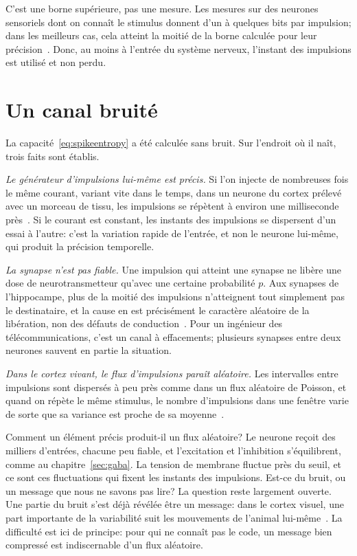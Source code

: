 C'est une borne supérieure, pas une mesure. Les mesures sur des neurones sensoriels dont on connaît le stimulus donnent d'un à quelques bits par impulsion; dans les meilleurs cas, cela atteint la moitié de la borne calculée pour leur précision~\cite{Rieke1997}. Donc, au moins à l'entrée du système nerveux, l'instant des impulsions est utilisé et non perdu.

\section{Un canal bruité}

La capacité~\eqref{eq:spikeentropy} a été calculée sans bruit. Sur l'endroit où il naît, trois faits sont établis.

\emph{Le générateur d'impulsions lui-même est précis.} Si l'on injecte de nombreuses fois le même courant, variant vite dans le temps, dans un neurone du cortex prélevé avec un morceau de tissu, les impulsions se répètent à environ une milliseconde près~\cite{Mainen1995}. Si le courant est constant, les instants des impulsions se dispersent d'un essai à l'autre: c'est la variation rapide de l'entrée, et non le neurone lui-même, qui produit la précision temporelle.

\emph{La synapse n'est pas fiable.} Une impulsion qui atteint une synapse  ne libère une dose de neurotransmetteur qu'avec une certaine probabilité $p$. Aux synapses de l'hippocampe, plus de la moitié des impulsions n'atteignent tout simplement pas le destinataire, et la cause en est précisément le caractère aléatoire de la libération, non des défauts de conduction~\cite{AllenStevens1994}. Pour un ingénieur des télécommunications, c'est un canal à effacements; plusieurs synapses entre deux neurones sauvent en partie la situation.

\emph{Dans le cortex vivant, le flux d'impulsions paraît aléatoire.} Les intervalles entre impulsions sont dispersés à peu près comme dans un flux aléatoire de Poisson, et quand on répète le même stimulus, le nombre d'impulsions dans une fenêtre varie de sorte que sa variance est proche de sa moyenne~\cite{Softky1993}.

Comment un élément précis produit-il un flux aléatoire? Le neurone reçoit des milliers d'entrées, chacune peu fiable, et l'excitation et l'inhibition s'équilibrent, comme au chapitre~\ref{sec:gaba}. La tension de membrane fluctue près du seuil, et ce sont ces fluctuations qui fixent les instants des impulsions. Est-ce du bruit, ou un message que nous ne savons pas lire? La question reste largement ouverte. Une partie du \og bruit\fg{} s'est déjà révélée être un message: dans le cortex visuel, une part importante de la variabilité suit les mouvements de l'animal lui-même~\cite{Stringer2019}. La difficulté est ici de principe: pour qui ne connaît pas le code, un message bien compressé est indiscernable d'un flux aléatoire.


